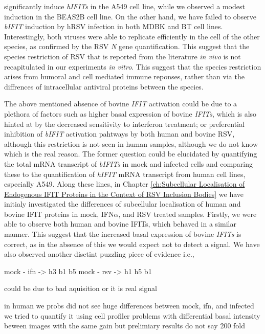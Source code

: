 significantly induce \textit{hIFITs} in the A549 cell line, while we observed a modest induction in the BEAS2B cell line. On the other hand, we have failed to observe \textit{bIFIT} induction by hRSV infection in both MDBK and BT cell lines. Interestingly, both viruses were able to replicate efficiently in the cell of the other species, as confirmed by the RSV \textit{N} gene quantification. This suggest that the species restriction of RSV that is reported from the literature \textit{in vivo} is not recapitulated in our experiments \textit{in vitro}. This suggest that the species restriction arises from humoral and cell mediated immune reponses, rather than via the diffrences of intracellular antiviral proteins between the species.

% 
The above mentioned absence of bovine \textit{IFIT} activation could be due to a plethora of factors such as higher basal expression of bovine \textit{IFITs}, which is also hinted at by the decreased sensitivity to interferon treatment; or preferential inhibition of \textit{bIFIT} activation pahtways by both human and bovine RSV, although this restriction is not seen in human samples, although we do not know which is the real reason. The former question could be elucidated by quantifying the total mRNA transcript of \textit{bIFITs} in mock and infected cells and comparing these to the quantification of \textit{hIFIT} mRNA transcript from human cell lines, especially A549. Along these lines, in Chapter \ref{ch:Subcellular Localisation of Endogenous IFIT Proteins in the Context of RSV Inclusion Bodies} we have initialy investigated the differences of subcellular localisation of human and bovine IFIT proteins in mock, IFN$\alpha$, and RSV treated samples. Firstly, we were able to observe both human and bovine IFITs, which behaved in a similar manner. This suggest that the increased basal expression of bovine \textit{IFITs} is correct, as in the absence of this we would expect not to detect a signal. We have also observed another disctint puzzling piece of evidence i.e., 

mock - ifn -> h3 b1 b5
mock - rsv -> h1 h5 b1

could be due to bad aquisition or it is real signal

in human we probs did not see huge differences between mock, ifn, and infected
we tried to quantify it using cell profiler \cite{McQuin2018CellProfilerBiology}
problems with differential basal intensity beween images with the same gain
but prelimiary results do not say 200 fold

